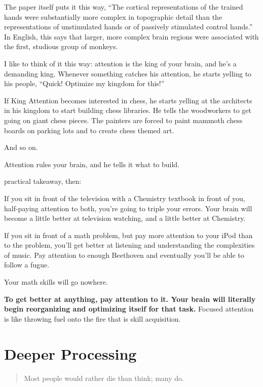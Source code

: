The paper itself puts it this way, ``The cortical representations of the trained
hands were substantially more complex in topographic detail than the
representations of unstimulated hands or of passively stimulated control
hands.'' In English, this says that larger, more complex brain regions were
associated with the first, studious group of monkeys.

I like to think of it this way: attention is the king of your brain, and he's a
demanding king. Whenever something catches his attention, he starts yelling to
his people, ``Quick! Optimize my kingdom for this!''

If King Attention becomes interested in chess, he starts yelling
at the architects in his kingdom to start building chess libraries. He tells the
woodworkers to get going on giant chess pieces. The painters are forced to
paint mammoth chess boards on parking lots and to create chess themed art.

And so on.

Attention rules your brain, and he tells it what to build.

 practical takeaway, then:

If you sit in front of the television with a Chemistry textbook in front of you,
half-paying attention to both, you're going to triple your errors. Your brain
will become a little better at television watching, and a little better at Chemistry.

If you sit in front of a math problem, but pay more attention to your iPod than
to the problem, you'll get better at listening and understanding the
complexities of music. Pay attention to enough Beethoven and eventually you'll
be able to follow a fugue.

Your math skills will go nowhere.

\textbf{To get better at anything, pay attention to it. Your brain will literally begin
reorganizing and optimizing itself for that task.} Focused attention is like
throwing fuel onto the fire that is skill acquisition.

\section{Deeper Processing}

\begin{quote}
  Most people would rather die than think; many do.
\end{quote}


